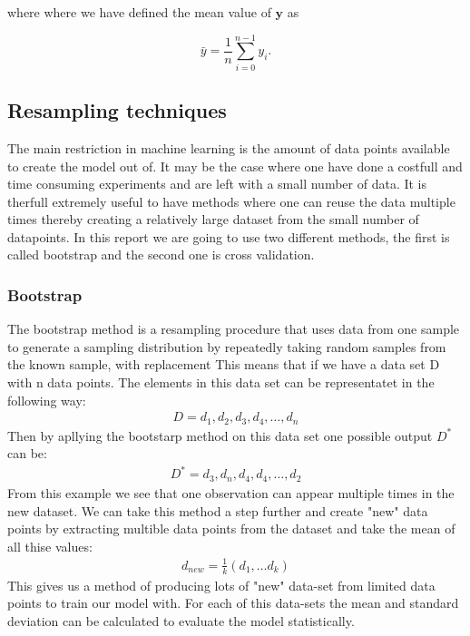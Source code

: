 \noindent where where we have defined the mean value of $\boldsymbol{y}$ as

\begin{equation} 
\bar{y} =  \frac{1}{n} \sum_{i=0}^{n - 1} y_i.
\end{equation}



\subsection{Resampling techniques}

\noindent The main restriction in machine learning is 
the amount of data points available to create the model out of. It may be the case where one have
done a costfull and time consuming experiments and are left with a small number of data. 
It is therfull extremely useful to have methods where one can reuse the data multiple times
thereby creating a relatively large dataset from the small number of datapoints. In this report
we are going to use two different methods, the first is called bootstrap and the second one is cross validation.

\subsubsection{Bootstrap} 
\noindent The bootstrap method is a resampling procedure that uses data from one 
sample to generate a sampling distribution by repeatedly taking random 
samples from the known sample, with replacement %
This means that if we have a data set D with n data points.
The elements in this data set can be representatet in the following way:
\begin{align}
    D = {d_1, d_2, d_3, d_4, \dots, d_n}
\end{align}
Then by apllying the bootstarp method on this data set one possible output $D^{*}$ can be:
\begin{align}
    D^{*} = {d_3, d_n, d_4, d_4 , \dots, d_2}
\end{align}
From this example we see that one observation can appear multiple times in the new dataset.
We can take this method a step further and create "new" data points by extracting multible data points from 
the dataset and take the mean of all thise values:
\begin{align}
    d_{new} = \frac{1}{k}(d_1, \dots d_k)
\end{align}
This gives us a method of producing lots of "new" data-set from 
limited data points to train our model with. For each of this data-sets
the mean and standard deviation can be calculated to evaluate the model statistically. \cite{MLM}


